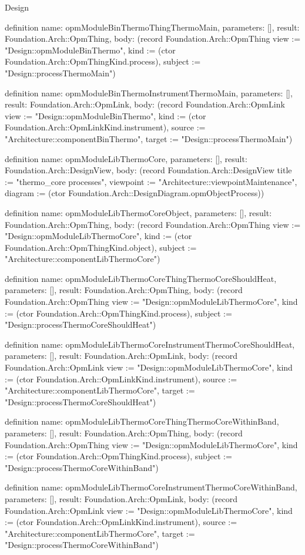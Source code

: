 \begin{lexlean}{Design}
\begin{semanticmodule}
definition{
  name: opmModuleBinThermoThingThermoMain,
  parameters: [],
  result: Foundation.Arch::OpmThing,
  body: (record Foundation.Arch::OpmThing {view := "Design::opmModuleBinThermo", kind := (ctor Foundation.Arch::OpmThingKind.process), subject := "Design::processThermoMain"})
}

definition{
  name: opmModuleBinThermoInstrumentThermoMain,
  parameters: [],
  result: Foundation.Arch::OpmLink,
  body: (record Foundation.Arch::OpmLink {view := "Design::opmModuleBinThermo", kind := (ctor Foundation.Arch::OpmLinkKind.instrument), source := "Architecture::componentBinThermo", target := "Design::processThermoMain"})
}

definition{
  name: opmModuleLibThermoCore,
  parameters: [],
  result: Foundation.Arch::DesignView,
  body: (record Foundation.Arch::DesignView {title := "thermo_core processes", viewpoint := "Architecture::viewpointMaintenance", diagram := (ctor Foundation.Arch::DesignDiagram.opmObjectProcess)})
}

definition{
  name: opmModuleLibThermoCoreObject,
  parameters: [],
  result: Foundation.Arch::OpmThing,
  body: (record Foundation.Arch::OpmThing {view := "Design::opmModuleLibThermoCore", kind := (ctor Foundation.Arch::OpmThingKind.object), subject := "Architecture::componentLibThermoCore"})
}

definition{
  name: opmModuleLibThermoCoreThingThermoCoreShouldHeat,
  parameters: [],
  result: Foundation.Arch::OpmThing,
  body: (record Foundation.Arch::OpmThing {view := "Design::opmModuleLibThermoCore", kind := (ctor Foundation.Arch::OpmThingKind.process), subject := "Design::processThermoCoreShouldHeat"})
}

definition{
  name: opmModuleLibThermoCoreInstrumentThermoCoreShouldHeat,
  parameters: [],
  result: Foundation.Arch::OpmLink,
  body: (record Foundation.Arch::OpmLink {view := "Design::opmModuleLibThermoCore", kind := (ctor Foundation.Arch::OpmLinkKind.instrument), source := "Architecture::componentLibThermoCore", target := "Design::processThermoCoreShouldHeat"})
}

definition{
  name: opmModuleLibThermoCoreThingThermoCoreWithinBand,
  parameters: [],
  result: Foundation.Arch::OpmThing,
  body: (record Foundation.Arch::OpmThing {view := "Design::opmModuleLibThermoCore", kind := (ctor Foundation.Arch::OpmThingKind.process), subject := "Design::processThermoCoreWithinBand"})
}

definition{
  name: opmModuleLibThermoCoreInstrumentThermoCoreWithinBand,
  parameters: [],
  result: Foundation.Arch::OpmLink,
  body: (record Foundation.Arch::OpmLink {view := "Design::opmModuleLibThermoCore", kind := (ctor Foundation.Arch::OpmLinkKind.instrument), source := "Architecture::componentLibThermoCore", target := "Design::processThermoCoreWithinBand"})
}


\end{semanticmodule}
\end{lexlean}
